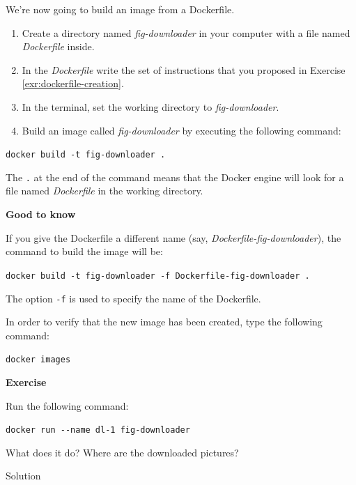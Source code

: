 \documentclass[
]{article}
\newenvironment{infobox}[1]
  {
  \begin{itemize}
  \renewcommand{\labelitemi}{
    \raisebox{-.7\height}[0pt][0pt]{
      
    }
  }
  \setlength{\fboxsep}{1em}
  \begin{whitebox}
  \item
  }
  {
  \end{whitebox}
  \end{itemize}
  }
\theoremstyle{definition}
\theoremstyle{definition}
\theoremstyle{definition}
\theoremstyle{remark}
\let\BeginKnitrBlock\begin \let\EndKnitrBlock\end
\begin{document}
We're now going to build an image from a Dockerfile.

\begin{enumerate}
\def\labelenumi{\arabic{enumi}.}
\item
  Create a directory named \emph{fig-downloader} in your computer with
  a file named \emph{Dockerfile} inside.
\item
  In the \emph{Dockerfile} write the set of instructions that
  you proposed in Exercise \ref{exr:dockerfile-creation}.
\item
  In the terminal, set the working directory to \emph{fig-downloader}.
\item
  Build an image called \emph{fig-downloader} by executing the following command:
\end{enumerate}

\texttt{docker\ build\ -t\ fig-downloader\ .}

The \texttt{.} at the end of the command means that the Docker engine will
look for a file named \emph{Dockerfile} in the working directory.

\begin{infobox}{curiosity}
\textbf{Good to know}

If you give the Dockerfile a different name (say, \emph{Dockerfile-fig-downloader}),
the command to build the image will be:

\texttt{docker\ build\ -t\ fig-downloader\ -f\ Dockerfile-fig-downloader\ .}

The option \texttt{-f} is used to specify the name of the Dockerfile.

\end{infobox}

In order to verify that the new image has been created, type the following command:

\texttt{docker\ images}

\begin{infobox}{exercisebox}

\textbf{Exercise}

\BeginKnitrBlock{exercise}
\label{exr:dl-1-container}{\label{exr:dl-1-container} }Run the following command:

\texttt{docker\ run\ -\/-name\ dl-1\ fig-downloader}

What does it do? Where are the downloaded pictures?
\EndKnitrBlock{exercise}

\end{infobox}

Solution
\end{document}
